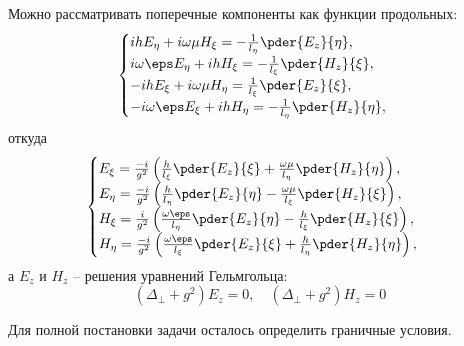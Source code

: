 Можно рассматривать поперечные компоненты как функции продольных:
\[
	\begin{cases}
		ihE_\eta + i\omega\mu H_\xi = -\frac{1}{l_\eta}\pder{E_z}{\eta},\\
		i\omega\eps E_\eta + ihH_\xi = -\frac{1}{l_\xi}\pder{H_z}{\xi},\\
		-ihE_\xi + i\omega\mu H_\eta = \frac{1}{l_\xi}\pder{E_z}{\xi},\\
		- i\omega\eps E_\xi + ihH_\eta = -\frac{1}{l_\eta}\pder{H_z}{\eta},\\
	\end{cases}
\]
откуда
\[
	\begin{cases}
		E_\xi  = \frac{-i}{g^2}\left(\frac{h}{l_\xi}\pder{E_z}{\xi} +\frac{\omega\mu}{l_\eta}\pder{H_z}{\eta}\right),\\
		E_\eta = \frac{-i}{g^2}\left(\frac{h}{l_\eta}\pder{E_z}{\eta} - \frac{\omega\mu}{l_\xi}\pder{H_z}{\xi}\right),\\
		H_\xi  = \frac{i}{g^2}\left(\frac{\omega\eps}{l_\eta}\pder{E_z}{\eta} - \frac{h}{l_\xi}\pder{H_z}{\xi}\right),\\
		H_\eta = \frac{-i}{g^2}\left(\frac{\omega\eps}{l_\xi}\pder{E_z}{\xi} + \frac{h}{l_\eta}\pder{H_z}{\eta}\right),
	\end{cases}
\]
а \( E_z \) и \( H_z \) -- решения уравнений Гельмгольца:
\[
	(\Delta_\perp + g^2) E_z = 0, \quad (\Delta_\perp + g^2) H_z = 0
\]

Для полной постановки задачи осталось определить граничные условия.
